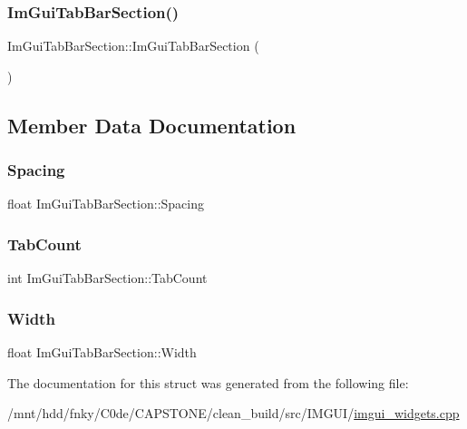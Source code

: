 \subsubsection{\texorpdfstring{Im\+Gui\+Tab\+Bar\+Section()}{ImGuiTabBarSection()}}
{\footnotesize\ttfamily Im\+Gui\+Tab\+Bar\+Section\+::\+Im\+Gui\+Tab\+Bar\+Section (\begin{DoxyParamCaption}{ }\end{DoxyParamCaption})\hspace{0.3cm}{\ttfamily [inline]}}



\subsection{Member Data Documentation}
\mbox{\label{structImGuiTabBarSection_a6fbf7f96db5e422c0c672a5a0943ba91}} 
\subsubsection{\texorpdfstring{Spacing}{Spacing}}
{\footnotesize\ttfamily float Im\+Gui\+Tab\+Bar\+Section\+::\+Spacing}

\mbox{\label{structImGuiTabBarSection_aa9020f621f8429e919c005c9a940b070}} 
\subsubsection{\texorpdfstring{Tab\+Count}{TabCount}}
{\footnotesize\ttfamily int Im\+Gui\+Tab\+Bar\+Section\+::\+Tab\+Count}

\mbox{\label{structImGuiTabBarSection_aad93edbb11bab3bb69a267a4239a7954}} 
\subsubsection{\texorpdfstring{Width}{Width}}
{\footnotesize\ttfamily float Im\+Gui\+Tab\+Bar\+Section\+::\+Width}



The documentation for this struct was generated from the following file\+:\begin{DoxyCompactItemize}
\item 
/mnt/hdd/fnky/\+C0de/\+C\+A\+P\+S\+T\+O\+N\+E/clean\+\_\+build/src/\+I\+M\+G\+U\+I/\hyperlink{imgui__widgets_8cpp}{imgui\+\_\+widgets.\+cpp}\end{DoxyCompactItemize}
